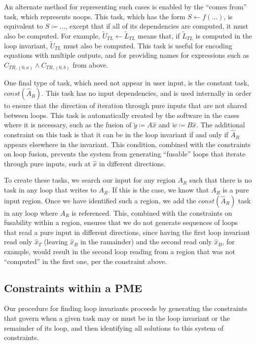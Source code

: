 \documentclass[12pt,letterpaper]{article}
\begin{document}
An alternate method for representing such cases is enabled by the ``comes from'' task, which represents noops.
This task, which has the form $S \leftarrow f(\ldots)$, is equivalent to $S \coloneqq \ldots$, except that if all of its dependencies are computed, it must also be computed.
For example, $\widetilde{U}_{TL} \leftarrow \widetilde{L}_{TL}$ means that, if $\widetilde{L}_{TL}$ is computed in the loop invariant, $\widetilde{U}_{TL}$ must also be computed.
This task is useful for encoding equations with multiple outputs, and for providing names for expressions such as $C_{TR, (0, a)} \wedge C_{TR, (0, b)}$ from above.

One final type of task, which need not appear in user input, is the constant task, $const(\hat{A}_R)$.
This task has no input dependencies, and is used internally in order to ensure that the direction of iteration through pure inputs that are not shared between loops.
This task is automatically created by the software in the cases where it is necessary, such as the fusion of $\widetilde{y} \coloneqq A\hat{x}$ and $\widetilde{w} \coloneqq B\hat{x}$.
The additional constraint on this task is that it can be in the loop invariant if and only if $\hat{A}_R$ appears elsewhere in the invariant.
This condition, combined with the constraints on loop fusion, prevents the system from generating ``fusable'' loops that iterate through pure inputs, such at $\hat{x}$ in different directions.

To create these tasks, we search our input for any region $A_R$ such that there is no task in any loop that writes to $A_R$.
If this is the case, we know that $A_R$ is a pure input region.
Once we have identified such a region, we add the $const(\hat{A}_R)$ task in any loop where $A_R$ is referenced.
This, combined with the constraints on fusability within a region, ensures that we do not generate sequences of loops that read a pure input in different directions, since having the first loop invariant read only $\hat{x}_T$ (leaving $\hat{x}_B$ in the ramainder) and the second read only $\hat{x}_B$, for example, would result in the second loop reading from a region that was not ``computed'' in the first one, per the constraint above.

\subsection{Constraints within a PME}
Our procedure for finding loop invariants proceeds by generating the constraints that govern when a given task may or must be in the loop invariant or the remainder of its loop, and then identifying all solutions to this system of constraints.
\end{document}
